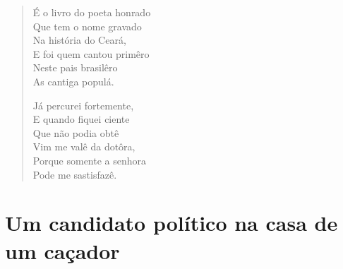 \begin{verse}
É o livro do poeta honrado\\
Que tem o nome gravado\\
Na história do Ceará,\\
E foi quem cantou primêro\\
Neste pais brasilêro\\
As cantiga populá.

Já percurei fortemente,\\
E quando fiquei ciente\\
Que não podia obtê\\
Vim me valê da dotôra,\\
Porque somente a senhora\\
Pode me sastisfazê.
\end{verse}

\chapter{Um candidato político na casa de um caçador}

